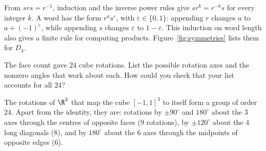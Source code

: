 From $srs=r^{-1}$, induction and the inverse power rules give
$sr^k=r^{-k}s$ for every integer $k$. A word has the form $r^as^\varepsilon$,
with $\varepsilon\in\{0,1\}$: appending $r$ changes $a$ to
$a+(-1)^\varepsilon$, while appending $s$ changes $\varepsilon$ to
$1-\varepsilon$. This induction on word length also gives a finite rule
for computing products. Figure~\ref{fig:symmetries} lists them for $D_4$.

\begin{think}
The face count gave $24$ cube rotations. List the possible rotation axes
and the nonzero angles that work about each. How could you check that
your list accounts for all $24$?
\end{think}

\begin{proposition}\label{prop:cube}
The rotations of $\R^3$ that map the cube $[-1,1]^3$ to itself form a group of order $24$. Apart from the identity, they are: rotations by $\pm90^\circ$ and $180^\circ$ about the $3$ axes through the centres of opposite faces ($9$ rotations), by $\pm120^\circ$ about the $4$ long diagonals ($8$), and by $180^\circ$ about the $6$ axes through the midpoints of opposite edges ($6$).
\end{proposition}
